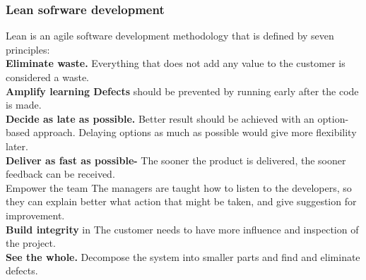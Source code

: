 \subsubsection{Lean sofrware development}
Lean is an agile software development methodology that is defined by seven principles:\\
{\bf Eliminate waste.} Everything that does not add any value to the customer is considered a waste.\\
{\bf Amplify learning Defects} should be prevented by running early after the code is made.\\
{\bf Decide as late as possible.} Better result should be achieved with an option-based approach. Delaying options as much as possible would give more flexibility later.\\
{\bf Deliver as fast as possible-} The sooner the product is delivered, the sooner feedback can be received.\\
Empower the team The managers are taught how to listen to the developers, so they can explain better what action that might be taken, and give suggestion for improvement.\\
{\bf Build integrity} in The customer needs to have more influence and inspection of the project.\\
{\bf See the whole.} Decompose the system into smaller parts and find and eliminate defects.